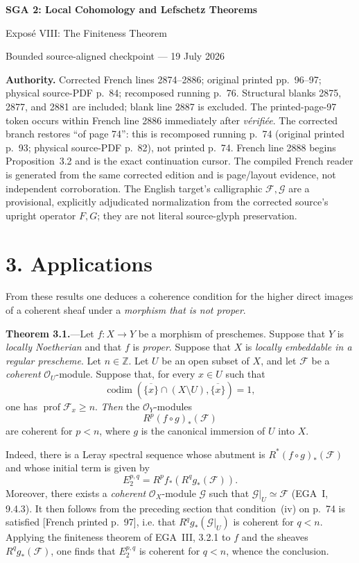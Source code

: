 \documentclass[10pt,a4paper]{article}
\newcommand{\cF}{\mathcal F}
\newcommand{\cG}{\mathcal G}
\newcommand{\cO}{\mathcal O}
\newcommand{\prof}{\operatorname{prof}}
\newcommand{\codimn}{\operatorname{codim}}
\begin{document}
\begin{center}
  {\Large\bfseries SGA 2: Local Cohomology and Lefschetz Theorems}\par\smallskip
  {\large Expos\'e VIII: The Finiteness Theorem}\par
  \small Bounded source-aligned checkpoint --- 19 July 2026
\end{center}
\noindent\colorbox{softgray}{\parbox{0.95\linewidth}{\footnotesize\textbf{Authority.}
Corrected French lines 2874--2886; original printed pp.~96--97; physical
source-PDF p.~84; recomposed running p.~76. Structural blanks 2875, 2877,
and 2881 are included; blank line 2887 is excluded. The printed-page-97
token occurs within French line 2886 immediately after \emph{v\'erifi\'ee}.
The corrected branch restores ``of page 74'': this is recomposed running
p.~74 (original printed p.~93; physical source-PDF p.~82), not printed p.~74.
French line 2888 begins Proposition~3.2 and is the exact continuation cursor.
The compiled French reader is generated from the same corrected edition and
is page/layout evidence, not independent corroboration. The English target's
calligraphic $\cF,\cG$ are a provisional, explicitly adjudicated normalization
from the corrected source's upright operator $F,G$; they are not literal
source-glyph preservation.}}

\section*{3. Applications}

\noindent From these results one deduces a coherence condition for the higher
direct images of a coherent sheaf under a \emph{morphism that is not proper}.

\medskip
\noindent\textbf{Theorem 3.1.}---Let $f\colon X\to Y$ be a morphism of
preschemes. Suppose that $Y$ is \emph{locally Noetherian} and that $f$ is
\emph{proper}. Suppose that $X$ is \emph{locally embeddable in a regular
prescheme}. Let $n\in\mathbb Z$. Let $U$ be an open subset of $X$, and let
$\cF$ be a \emph{coherent} $\cO_U$-module. Suppose that, for every $x\in U$
such that
\[
  \codimn(\overline{\{x\}}\cap(X\setminus U),
  \overline{\{x\}})=1,
\]
one has $\prof\cF_x\geq n$. \emph{Then} the $\cO_Y$-modules
\[
  R^p(f\circ g)_*(\cF)
\]
are coherent for $p<n$, where $g$ is the canonical immersion of $U$ into
$X$.

\medskip
\noindent Indeed, there is a Leray spectral sequence whose abutment is
$R^*(f\circ g)_*(\cF)$ and whose initial term is given by
\[
  E_2^{p,q}=R^p f_*(R^q g_*(\cF)).
\]
Moreover, there exists a \emph{coherent} $\cO_X$-module $\cG$ such that
$\cG|_U\simeq\cF$ (EGA~I, 9.4.3). It then follows from the preceding section
that condition~\textup{(iv)} on p.~74 is satisfied
{\scriptsize\color{gray}[French printed p.~97]}, i.e. that
$R^q g_*(\cG|_U)$ is coherent for $q<n$. Applying the finiteness theorem of
EGA~III, 3.2.1 to $f$ and the sheaves $R^q g_*(\cF)$, one finds that
$E_2^{p,q}$ is coherent for $q<n$, whence the conclusion.
\end{document}
